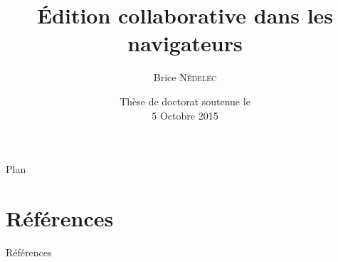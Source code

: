 \documentclass[10pt, xcolor={usenames, dvipsnames}]{beamer}
\title{Édition collaborative dans les navigateurs}
\author{Brice \textsc{N\'edelec}}
\institute{\normalsize{Université de Nantes, LINA}}
\date{Thèse de doctorat soutenue le\\5 Octobre 2015}
\begin{document}
  \begin{frame}
    \titlepage
  \end{frame}

  

  \begin{frame}{Plan}
    \tableofcontents
  \end{frame}



  
  
  

  
  
  \section*{Références}
  \begin{frame}[allowframebreaks]{Références}
    \def\newblock{\hskip .11em plus .33em minus .07em}
    
    
  \end{frame}
  
\end{document}
